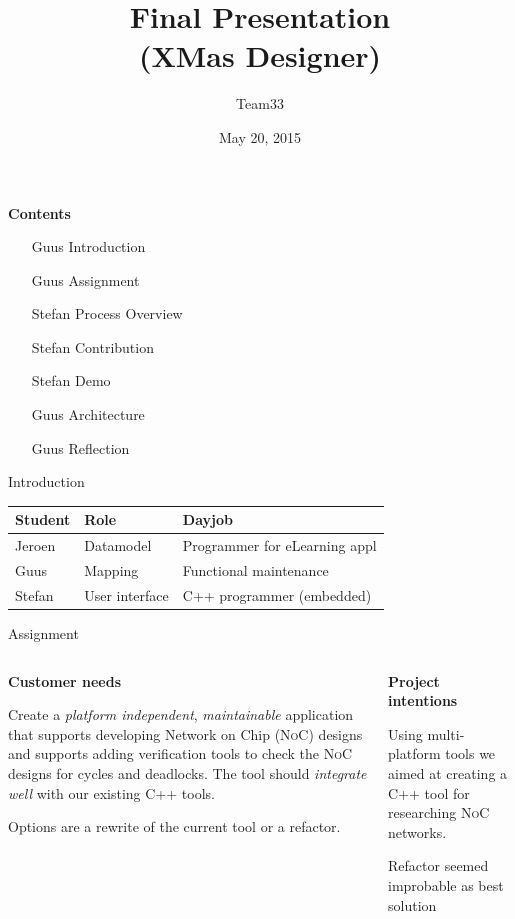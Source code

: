 \documentclass[11pt]{beamer}
\author{Team33}
\title{Final Presentation\\(XMas Designer)}
\institute{Open University\\team033\\Guus Bonnema, Stefan Versluys, Jeroen Kleijn}
\date{May 20, 2015}
\begin{document}
\newcommand{\Noc}{\textsc{NoC}\xspace}
\newcommand{\qt}{\textsc{Qt}\xspace}
\newcommand{\qml}{\textsc{Qml}\xspace}

\begin{frame}
	\titlepage
\end{frame}

\begin{frame}
	{\bf Contents}
	\begin{itemize}
		\item [Guus] Introduction 
		\item [Guus] Assignment
		\item [Stefan] Process Overview
		\item [Stefan] Contribution
		\item [Stefan] Demo
		\item [Guus] Architecture
		\item [Guus] Reflection
	\end{itemize}
	
\end{frame}

\begin{frame}{Introduction}
	\begin{tabular}{lp{2.5cm}p{4cm}}
	\hline
	{\bf Student} & {\bf Role}      & {\bf Dayjob}\\\hline
	Jeroen        &  Datamodel      & Programmer for eLearning appl\\
	Guus		  &  Mapping        & Functional maintenance\\
	Stefan        &  User interface & C++ programmer (embedded)\\
	\hline
	\end{tabular}
\end{frame}

\begin{frame}{Assignment}
	\begin{columns}
		\begin{column}[t]{5cm}
		{\bf Customer needs}

		Create a {\it platform independent}, {\it maintainable} application that supports
		developing Network on Chip (\Noc) designs and supports adding verification tools
		to check the \Noc designs for cycles and deadlocks. The tool should {\it integrate well}
		with our existing C++ tools.
		
		Options are a rewrite
		of the current tool or a refactor.
		\end{column}
		\begin{column}[t]{5cm}
		{\bf Project intentions}		
		
		Using multi-platform tools we aimed at creating a C++ tool for researching \Noc networks.
		
		Refactor seemed improbable as best solution
		\end{column}
	\end{columns}
\end{frame}
\end{document}

